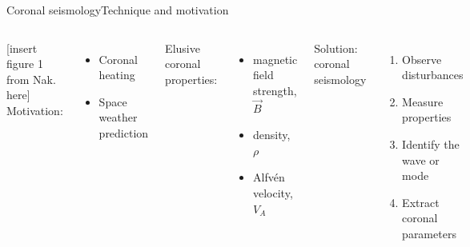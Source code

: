 \documentclass[table]{beamer}
\begin{document}
\begin{frame}{Coronal seismology}{Technique and motivation}
\begin{columns}
[insert figure 1 from Nak. here]
    Motivation:
    \begin{itemize}
        \item Coronal heating
        \item Space weather prediction
    \end{itemize}
    Elusive coronal properties:
    \begin{itemize}
        \item magnetic field strength, $\vec{B}$
        \item density, $\rho$
        \item Alfv\'en velocity, $V_A$
    \end{itemize}
    Solution: coronal seismology
    \begin{enumerate}
        \item Observe disturbances
        \item Measure properties
        \item Identify the wave or mode
        \item Extract coronal parameters
    \end{enumerate}
\end{columns}
\end{frame}%
\end{document}
